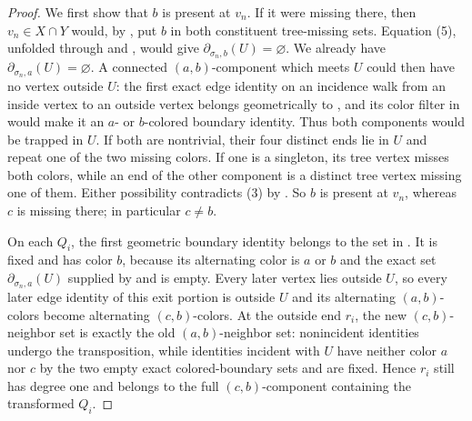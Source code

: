 \begin{proof}
We first show that $b$ is present at $v_n$.  If it were missing there,
then $v_n\in X\cap Y$ would, by , put $b$ in
both constituent tree-missing sets.  Equation (5), unfolded through
 and , would give
$\partial_{\sigma_n,b}(U)=\varnothing$.  We already have
$\partial_{\sigma_n,a}(U)=\varnothing$.  A connected
$(a,b)$-component which meets $U$ could then have no vertex outside $U$:
the first exact edge identity on an incidence walk from an inside vertex
to an outside vertex belongs geometrically to ,
and its color filter in  would make it an
$a$- or $b$-colored boundary identity.  Thus both components would be trapped in
$U$.  If both are nontrivial, their four distinct ends lie in $U$ and
repeat one of the two missing colors.  If one is a singleton, its tree
vertex misses both colors, while an end of the other component is a
distinct tree vertex missing one of them.  Either possibility contradicts
(3) by .
So $b$ is present at $v_n$, whereas $c$ is missing there; in particular
$c\ne b$.

On each $Q_i$, the first geometric boundary identity belongs to the set
in .  It is fixed and has color $b$, because its
alternating color is $a$ or $b$ and the exact set
$\partial_{\sigma_n,a}(U)$ supplied by  and
 is empty.  Every later vertex lies outside $U$, so every
later edge identity of this exit portion is outside $U$ and its alternating
$(a,b)$-colors become alternating $(c,b)$-colors.  At the outside end
$r_i$, the new $(c,b)$-neighbor set is exactly the old $(a,b)$-neighbor
set: nonincident identities undergo the transposition, while identities
incident with $U$ have neither color $a$ nor $c$ by the two empty exact
colored-boundary sets and are fixed.  Hence $r_i$ still has degree one and belongs
to the full $(c,b)$-component containing the transformed $Q_i$.


\end{proof}
